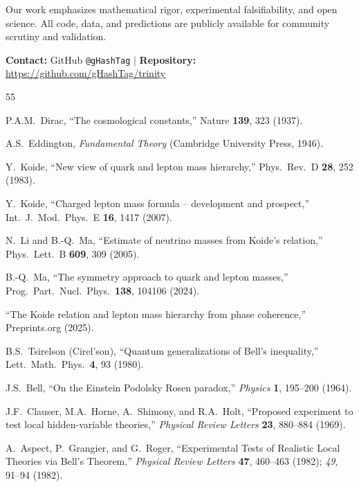\documentclass[aps,prd,preprint,superscriptaddress,showpacs,nofootinbib,longbibliography]{revtex4-2}
\begin{document}
Our work emphasizes mathematical rigor, experimental falsifiability, and open science. All code, data, and predictions are publicly available for community scrutiny and validation.

\textbf{Contact:} GitHub \texttt{@gHashTag} \quad | \quad \textbf{Repository:} \url{https://github.com/gHashTag/trinity}


\begin{thebibliography}{55}

P.A.M.~Dirac,
``The cosmological constants,''
Nature \textbf{139}, 323 (1937).

A.S.~Eddington,
\textit{Fundamental Theory} (Cambridge University Press, 1946).

Y.~Koide,
``New view of quark and lepton mass hierarchy,''
Phys.\ Rev.\ D \textbf{28}, 252 (1983).

Y.~Koide,
``Charged lepton mass formula -- development and prospect,''
Int.\ J.\ Mod.\ Phys.\ E \textbf{16}, 1417 (2007).

N.~Li and B.-Q.~Ma,
``Estimate of neutrino masses from Koide's relation,''
Phys.\ Lett.\ B \textbf{609}, 309 (2005).

B.-Q.~Ma,
``The symmetry approach to quark and lepton masses,''
Prog.\ Part.\ Nucl.\ Phys.\ \textbf{138}, 104106 (2024).

``The Koide relation and lepton mass hierarchy from phase coherence,''
Preprints.org (2025).

B.S.~Tsirelson (Cirel'son),
``Quantum generalizations of Bell's inequality,''
Lett.\ Math.\ Phys.\ \textbf{4}, 93 (1980).

J.S.~Bell,
``On the Einstein Podolsky Rosen paradox,''
\textit{Physics} \textbf{1}, 195--200 (1964).

J.F.~Clauser, M.A.~Horne, A.~Shimony, and R.A.~Holt,
``Proposed experiment to test local hidden-variable theories,''
\textit{Physical Review Letters} \textbf{23}, 880--884 (1969).

A.~Aspect, P.~Grangier, and G.~Roger,
``Experimental Tests of Realistic Local Theories via Bell's Theorem,''
\textit{Physical Review Letters} \textbf{47}, 460--463 (1982);
\textit{49}, 91--94 (1982).


\end{thebibliography}
\end{document}
